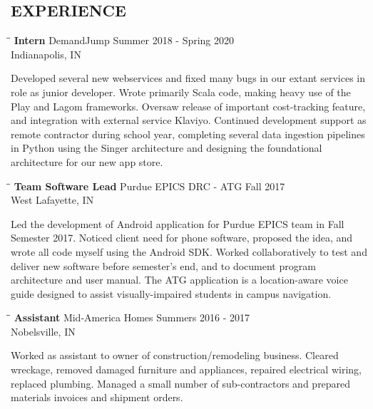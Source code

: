 \documentclass[10pt]{res}
\begin{document}
\begin{resume}
\vspace{-20pt}\section{EXPERIENCE}
   \vspace{-0.1in}	
	\begin{tabbing}
   \hspace{2.3in}\= \hspace{2.6in}\= \kill %
    {\bf Intern} \>DemandJump \>Summer 2018 - Spring 2020 \\
                             \>Indianapolis, IN
   \end{tabbing}\vspace{-20pt}      %
  Developed several new webservices and fixed many bugs in our extant services in role as junior
  developer. Wrote primarily Scala code, making heavy use of the Play and Lagom frameworks. Oversaw release of important cost-tracking feature, and integration with external service
  Klaviyo. Continued development support as remote contractor during school year, completing several
	data ingestion pipelines in Python using the Singer architecture and designing the foundational architecture
	for our new app store.
	\vspace{-10pt}\begin{tabbing}
   \hspace{2.3in}\= \hspace{2.6in}\= \kill %
    {\bf Team Software Lead} \>Purdue EPICS DRC - ATG \>Fall 2017 \\
                             \>West Lafayette, IN
   \end{tabbing}\vspace{-20pt}      %
	Led the development of Android application for Purdue EPICS team in Fall Semester 2017. Noticed client need for phone software, proposed the idea, and wrote all code myself
	using the Android SDK. Worked collaboratively to test and deliver new software before semester's end, and to document program architecture and user manual. The ATG
	application is a location-aware voice guide designed to assist visually-impaired students in campus navigation.
	\vspace{-10pt}\begin{tabbing}
   \hspace{2.3in}\= \hspace{2.6in}\= \kill %
    {\bf Assistant} \>Mid-America Homes \>Summers 2016 - 2017 \\
                             \>Nobelsville, IN
   \end{tabbing}\vspace{-20pt}      %
	Worked as assistant to owner of construction/remodeling business. 
	Cleared wreckage, removed damaged furniture and appliances, repaired electrical wiring, replaced plumbing. 
	Managed a small number of sub-contractors and prepared materials invoices and shipment orders. 
	

\end{resume}
\end{document}
